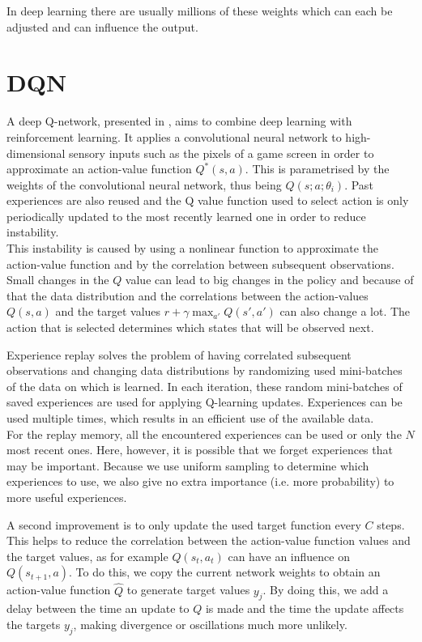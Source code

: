 \documentclass[a4paper]{article}
\begin{document}
In deep learning there are usually millions of these weights which can each be adjusted and can influence the output.

\section{DQN}
A deep Q-network, presented in \cite{Mnih2015Human-levelLearning}, aims to combine deep learning with reinforcement learning. It applies a convolutional neural network to high-dimensional sensory inputs such as the pixels of a game screen in order to approximate an action-value function $Q^{*}(s,a)$. This is parametrised by the weights of the convolutional neural network, thus being $Q(s;a;\theta_i)$. Past experiences are also reused and the Q value function used to select action is only periodically updated to the most recently learned one in order to reduce instability.\\

This instability is caused by using a nonlinear function to approximate the action-value function and by the correlation between subsequent observations. Small changes in the $Q$ value can lead to big changes in the policy and because of that the data distribution and the correlations between the action-values $Q(s,a)$ and the target values $r+\gamma \max_{a'} Q(s',a')$ can also change a lot. The action that is selected determines which states that will be observed next.

Experience replay solves the problem of having correlated subsequent observations and changing data distributions by randomizing used mini-batches of the data on which is learned. In each iteration, these random mini-batches of saved experiences are used for applying Q-learning updates. Experiences can be used multiple times, which results in an efficient use of the available data.\\
For the replay memory, all the encountered experiences can be used or only the $N$ most recent ones. Here, however, it is possible that we forget experiences that may be important. Because we use uniform sampling to determine which experiences to use, we also give no extra importance (i.e. more probability) to more useful experiences.

A second improvement is to only update the used target function every $C$ steps. This helps to reduce the correlation between the action-value function values and the target values, as for example $Q(s_t, a_t)$ can have an influence on $Q(s_{t+1},a)$. To do this, we copy the current network weights to obtain an action-value function $\hat{Q}$ to generate target values $y_j$. By doing this, we add a delay between the time an update to $Q$ is made and the time the update affects the targets $y_j$, making divergence or oscillations much more unlikely.
\end{document}
